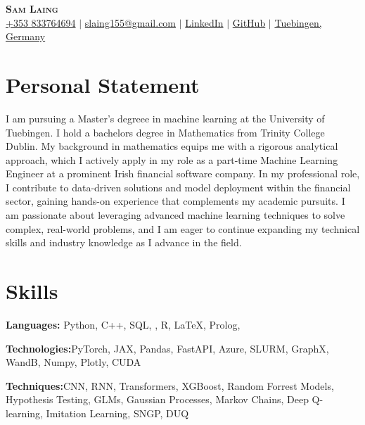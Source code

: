 \documentclass[letterpaper,11pt]{article}
\newcommand{\resumeSubHeadingListStart}{\begin{itemize}[leftmargin=0.15in, label={}]}
\newcommand{\resumeSubHeadingListEnd}{\end{itemize}}
\begin{document}

\begin{center}
    \textbf{\Huge \scshape Sam Laing} \\ \vspace{3pt}
    \small
    \faMobile \hspace{.5pt} \href{tel:353833764694}{+353 833764694}
    $|$
    \faAt \hspace{.5pt} \href{slaing155@gmail.com}{slaing155@gmail.com}
    $|$
    \faLinkedinSquare \hspace{.5pt} \href{https://www.linkedin.com/in/sam-laing-196403214}{LinkedIn}
    $|$
    \faGithub \hspace{.5pt} \href{https://github.com/sam-laing}{GitHub}
    $|$
    \faMapMarker \hspace{.5pt} \href{https://maps.app.goo.gl/zDdAp6SFpdj8fM548}{Tuebingen, Germany}
\end{center}

\section{Personal Statement}
I am pursuing a Master's degreee in machine learning at the University of Tuebingen. I hold a bachelors degree in Mathematics from Trinity College Dublin. My background in mathematics equips me with a rigorous analytical approach, which I actively apply in my role as a part-time Machine Learning Engineer at a prominent Irish financial software company. In my professional role, I contribute to data-driven solutions and model deployment within the financial sector, gaining hands-on experience that complements my academic pursuits. I am passionate about leveraging advanced machine learning techniques to solve complex, real-world problems, and I am eager to continue expanding my technical skills and industry knowledge as I advance in the field.

\section{Skills}
  \vspace{2pt}
  \resumeSubHeadingListStart
    \small{\item{
        
        \textbf{Languages:}{ Python, C++, SQL, , R, \LaTeX, Prolog, } \\ \vspace{3pt}
        
        \textbf{Technologies:}{PyTorch, JAX, Pandas, FastAPI, Azure, SLURM, GraphX, WandB, Numpy, Plotly, CUDA} \\ \vspace{3pt}
        
	\textbf{Techniques:}{CNN, RNN, Transformers, XGBoost, Random Forrest Models, Hypothesis Testing, GLMs, Gaussian Processes, Markov Chains, Deep Q-learning, Imitation Learning, SNGP, DUQ }
        
    }}
  \resumeSubHeadingListEnd
\end{document}
